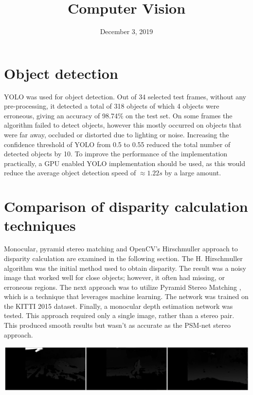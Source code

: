 \documentclass{article}
\title {\vspace{-5em}Computer Vision}
\date{\vspace{-1em}December 3, 2019}
\begin{document}
	\maketitle
	
	\section{Object detection}
	
	YOLO was used for object detection. Out of 34 selected test frames, without any pre-processing, it detected a total of 318 objects of which 4 objects were erroneous, giving an accuracy of 98.74\% on the test set. On some frames the algorithm failed to detect objects, however this mostly occurred on objects that were far away, occluded or distorted due to lighting or noise. Increasing the confidence threshold of YOLO from 0.5 to 0.55 reduced the total number of detected objects by 10. To improve the performance of the implementation practically, a GPU enabled YOLO implementation should be used, as this would reduce the average object detection speed of $\approx 1.22s$ by a large amount.
	
	\section{Comparison of disparity calculation techniques}
	
	Monocular, pyramid stereo matching and OpenCV’s Hirschmuller approach to disparity calculation are examined in the following section. The H. Hirschmuller algorithm \cite{hirschmuller2007stereo} was the initial method used to obtain disparity. The result was a noisy image that worked well for close objects; however, it often had missing, or erroneous regions. The next approach was to utilize Pyramid Stereo Matching \cite{chang2018pyramid}, which is a technique that leverages machine learning. The network was trained on the KITTI 2015 \cite{Menze2015ISA, Menze2018JPRS} dataset. Finally, a monocular depth estimation network\cite{monodepth2} was tested. This approach required only a single image, rather than a stereo pair. This produced smooth results but wasn’t as accurate as the PSM-net stereo approach.
	
	\vspace{-0.5em}
	\begin{minipage}{1.0\linewidth}
		\begin{center}
			\includegraphics[width=1.0\linewidth]{"../_submission/disparity_hirschmuller.png"}
		\end{center}
	\end{minipage}
\end{document}
